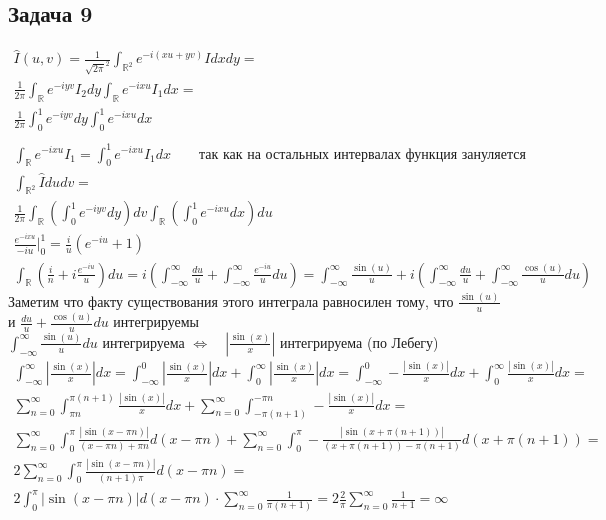 \subsection*{Задача 9}
	\begin{gather*}
	\hat{I}(u,v) =\frac{1}{\sqrt{2\pi}^2} \int_{\mathbb{R}^2} e^{-i(xu + yv)} I dxdy =\\
	\frac{1}{2 \pi} \int_{\mathbb{R}} e^{-iyv} I_2 dy \int_{\mathbb{R}} e^{-ixu} I_1 dx =\\
	\frac{1}{2 \pi} \int_{0}^{1} e^{-iyv} dy \int_{0}^{1} e^{-ixu} dx\\
	\\
	\int_{\mathbb{R}} e^{-ixu} I_1 = \int_{0}^{1} e^{-ixu} I_1 dx\qquad \text{так как на остальных интервалах функция зануляется}\\
	\int_{\mathbb{R}^2} \hat{I} dudv =\\
	\frac{1}{2 \pi} \int_{\mathbb{R}} \left(\int_{0}^{1} e^{-iyv} dy\right)dv \int_{\mathbb{R}} \left(\int_{0}^{1} e^{-ixu} dx\right)du\\
	\frac{e^{-ixu}}{-iu} \bigg|_{0}^{1} = \frac{i}{u} (e^{-iu} + 1)\\
	\int_{\mathbb{R}} \left(\frac{i}{n} + i \frac{e^{-iu}}{u}\right) du =
	i \left(\int_{-\infty}^{\infty} \frac{du}{u} + \int_{-\infty}^{\infty} \frac{e^{-iu}}{u} du\right) =
	\int_{-\infty}^{\infty} \frac{\sin(u)}{u} + i \left(\int_{-\infty}^{\infty} \frac{du}{u} + \int_{-\infty}^{\infty} \frac{\cos(u)}{u} du\right)
	\end{gather*}
	Заметим что факту существования этого интеграла равносилен тому, что $\frac{\sin(u)}{u}$ и $\frac{du}{u} + \frac{\cos(u)}{u} du$ интегрируемы\\
	$\int_{-\infty}^{\infty} \frac{\sin(u)}{u} du$ интегрируема $\Leftrightarrow\quad \left|\frac{\sin(x)}{x}\right|$ интегрируема (по Лебегу)
	\begin{gather*}
	\int_{-\infty}^{\infty} \left|\frac{\sin(x)}{x}\right| dx =
	\int_{-\infty}^{0} \left|\frac{\sin(x)}{x}\right| dx + \int_{0}^{\infty} \left|\frac{\sin(x)}{x}\right| dx =
	\int_{-\infty}^{0} -\frac{|\sin(x)|}{x} dx + \int_{0}^{\infty} \frac{|\sin(x)|}{x} dx =\\
	\sum_{n = 0}^{\infty} \int_{\pi n}^{\pi(n + 1)} \frac{|\sin(x)|}{x} dx + \sum_{n = 0}^{\infty} \int_{-\pi(n+1)}^{-\pi n} -\frac{|\sin(x)|}{x} dx =\\
	\sum_{n = 0}^{\infty} \int_{0}^{\pi} \frac{|\sin(x - \pi n)|}{(x - \pi n) + \pi n} d(x - \pi n) +
	\sum_{n = 0}^{\infty} \int_{0}^{\pi} -\frac{|\sin(x + \pi(n+1))|}{(x + \pi(n+1)) - \pi(n+1)} d(x + \pi(n+1)) =\\
	2\sum_{n = 0}^{\infty} \int_{0}^{\pi} \frac{|\sin(x - \pi n)|}{(n+1)\pi} d(x - \pi n) =\\
	2 \int_{0}^{\pi} |\sin(x - \pi n)| d(x - \pi n) \cdot \sum_{n = 0}^{\infty} \frac{1}{\pi (n+1)} = 2 \frac{2}{\pi} \sum_{n = 0}^{\infty} \frac{1}{n+1} = \infty
	\end{gather*}
